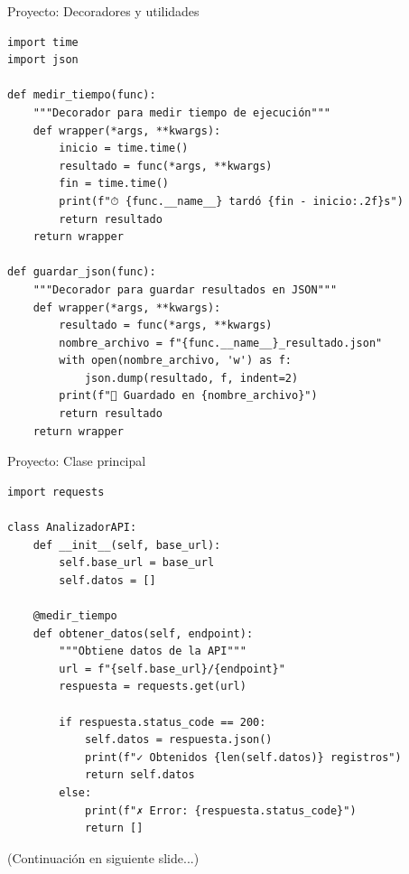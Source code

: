 \documentclass{beamer}
\begin{document}
\begin{frame}[fragile]{Proyecto: Decoradores y utilidades \faTools}
\begin{lstlisting}
import time
import json

def medir_tiempo(func):
    """Decorador para medir tiempo de ejecución"""
    def wrapper(*args, **kwargs):
        inicio = time.time()
        resultado = func(*args, **kwargs)
        fin = time.time()
        print(f"⏱ {func.__name__} tardó {fin - inicio:.2f}s")
        return resultado
    return wrapper

def guardar_json(func):
    """Decorador para guardar resultados en JSON"""
    def wrapper(*args, **kwargs):
        resultado = func(*args, **kwargs)
        nombre_archivo = f"{func.__name__}_resultado.json"
        with open(nombre_archivo, 'w') as f:
            json.dump(resultado, f, indent=2)
        print(f"💾 Guardado en {nombre_archivo}")
        return resultado
    return wrapper
\end{lstlisting}
\end{frame}

\begin{frame}[fragile]{Proyecto: Clase principal \faCode}
\begin{lstlisting}
import requests

class AnalizadorAPI:
    def __init__(self, base_url):
        self.base_url = base_url
        self.datos = []
    
    @medir_tiempo
    def obtener_datos(self, endpoint):
        """Obtiene datos de la API"""
        url = f"{self.base_url}/{endpoint}"
        respuesta = requests.get(url)
        
        if respuesta.status_code == 200:
            self.datos = respuesta.json()
            print(f"✓ Obtenidos {len(self.datos)} registros")
            return self.datos
        else:
            print(f"✗ Error: {respuesta.status_code}")
            return []
\end{lstlisting}

\small(Continuación en siguiente slide...)
\end{frame}
\end{document}
